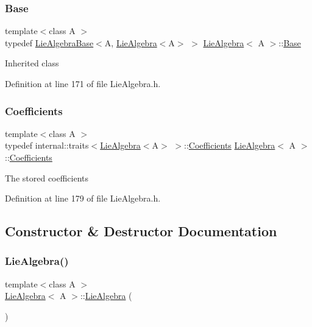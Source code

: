 \subsubsection{\texorpdfstring{Base}{Base}}
{\footnotesize\ttfamily template$<$class A $>$ \\
typedef \hyperlink{class_lie_algebra_base}{Lie\+Algebra\+Base}$<$A, \hyperlink{class_lie_algebra}{Lie\+Algebra}$<$A$>$ $>$ \hyperlink{class_lie_algebra}{Lie\+Algebra}$<$ A $>$\+::\hyperlink{class_lie_algebra_a28bc019eb9b070751abe554b0de567f4}{Base}\hspace{0.3cm}{\ttfamily [protected]}}

Inherited class 

Definition at line 171 of file Lie\+Algebra.\+h.

\hypertarget{class_lie_algebra_a366fde92cd31cf93be87fe82952c8ebb}{}\label{class_lie_algebra_a366fde92cd31cf93be87fe82952c8ebb} 
\subsubsection{\texorpdfstring{Coefficients}{Coefficients}}
{\footnotesize\ttfamily template$<$class A $>$ \\
typedef internal\+::traits$<$\hyperlink{class_lie_algebra}{Lie\+Algebra}$<$A$>$ $>$\+::\hyperlink{class_lie_algebra_a366fde92cd31cf93be87fe82952c8ebb}{Coefficients} \hyperlink{class_lie_algebra}{Lie\+Algebra}$<$ A $>$\+::\hyperlink{class_lie_algebra_a366fde92cd31cf93be87fe82952c8ebb}{Coefficients}}

The stored coefficients 

Definition at line 179 of file Lie\+Algebra.\+h.



\subsection{Constructor \& Destructor Documentation}
\hypertarget{class_lie_algebra_ac04b1456c7a78d070a6672b8f7989197}{}\label{class_lie_algebra_ac04b1456c7a78d070a6672b8f7989197} 
\subsubsection{\texorpdfstring{Lie\+Algebra()}{LieAlgebra()}}
{\footnotesize\ttfamily template$<$class A $>$ \\
\hyperlink{class_lie_algebra}{Lie\+Algebra}$<$ A $>$\+::\hyperlink{class_lie_algebra}{Lie\+Algebra} (\begin{DoxyParamCaption}\item[{const \hyperlink{class_lie_algebra}{Lie\+Algebra}$<$ A $>$ \&}]{ }\end{DoxyParamCaption})\hspace{0.3cm}{\ttfamily [inline]}}


